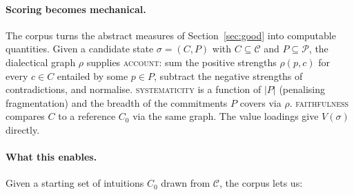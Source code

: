 \documentclass{article}
\begin{document}
\paragraph{Scoring becomes mechanical.} The corpus turns the abstract
measures of Section~\ref{sec:good} into computable quantities. Given a
candidate state $\sigma = (C, P)$ with $C \subseteq \mathcal{C}$ and
$P \subseteq \mathcal{P}$, the dialectical graph $\rho$ supplies
\textsc{account}: sum the positive strengths $\rho(p, c)$ for every
$c \in C$ entailed by some $p \in P$, subtract the negative strengths of
contradictions, and normalise. \textsc{systematicity} is a function of
$|P|$ (penalising fragmentation) and the breadth of the commitments $P$
covers via $\rho$. \textsc{faithfulness} compares $C$ to a reference
$C_0$ via the same graph. The value loadings give $V(\sigma)$ directly.

\paragraph{What this enables.} Given a starting set of intuitions $C_0$
drawn from $\mathcal{C}$, the corpus lets us:
\end{document}

